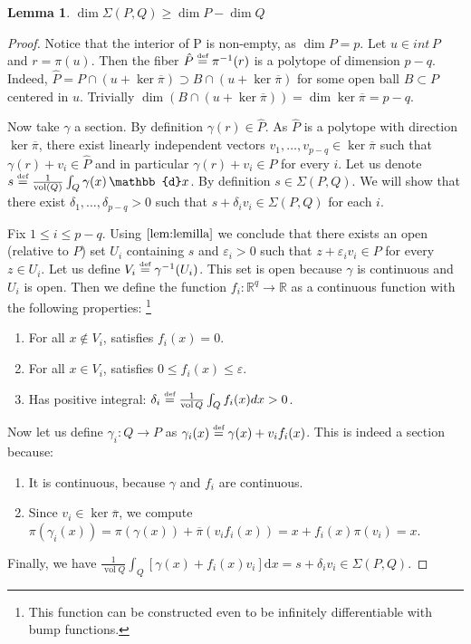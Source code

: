 \documentclass[10pt,a4paper]{article}
\DeclareMathOperator{\vol}{vol}
\def\defs{\stackrel{\tiny{\mbox{def}}}{=}}		%
\newcommand{\RR}{\mathbb{R}}
\newcommand{\eps}{\varepsilon}
\theoremstyle{plain}
\newtheorem{lemma}{Lemma}
\theoremstyle{remark}
\theoremstyle{definition}
\begin{document}
\begin{lemma} \label{lemm:dimm}
    $\dim \Sigma(P,Q) \geq \dim P - \dim Q$
\end{lemma} 
\begin{proof}
	Notice that the interior of P is non-empty, 
	as $\dim P=p$.	
	Let $u\in int \, P$ and $r=\pi(u)$. 
	Then the fiber $\hat{P}\defs \pi^{-1}(r)$ 
	is a polytope of dimension $p-q$. 
	Indeed, 
	$\hat{P}= P \cap (u + \ker \overline\pi)
	\supset B \cap (u + \ker \overline\pi)$ 
	for some open ball
	$B\subset P$ centered in $u$. 
	Trivially 
	$\dim (B \cap (u + \ker \overline\pi)) = 
	\dim \ker \overline\pi=p-q$.\par
	Now take $\gamma$ a section. 
	By definition $\gamma(r)\in \hat{P}$. 
	As $\hat{P}$ is a polytope with direction $\ker \overline\pi$,
	there exist linearly independent vectors 
	$v_1,\dots, v_{p-q}\in \ker \overline\pi$ such that 
	$\gamma(r)+ v_i\in \hat{P}$ and 
	in particular $\gamma(r)+ v_i \in P$ for every $i$.
	Let us denote $s\defs \frac{1}{\vol(Q)}\int_Q\gamma(x) \,\mathbb{d}x$. 
	By definition $s \in \Sigma(P,Q)$. 
	We will show that there exist $\delta_1,\dots, \delta_{p-q} > 0$ such that $s + \delta_i v_i \in \Sigma(P,Q)$ for each $i$. \par  
	Fix $1\leq i \leq p-q$. 
	Using $\cref{lem:lemilla}$ we conclude that 
	there exists an open (relative to $P$) set $U_i$ containing $s$ and $\eps_i>0$ 
	such that $z+ \eps_i v_i \in P$ for every $z\in U_i$.  
	Let us define $V_i \defs \gamma^{-1}(U_i)$.
	This set is open because $\gamma$ is continuous and $U_i$ is open.
	Then we define the function $f_i \colon \RR^q \to \RR$
	as a continuous function with the following properties:
	\footnote{This function can be constructed even to be infinitely differentiable
		with bump functions.}
	\begin{enumerate}
		\item For all $x\notin V_i$, satisfies $f_i(x) = 0$.
		\item For all $x\in V_i $, satisfies $0 \leq f_i(x) \leq \eps$.
		\item \label{itm:prova} Has positive integral: 
		$\delta_i \defs \frac{1}{\vol Q}\int_Q f_i(x) dx > 0$.
	\end{enumerate}
	
	Now let us define $\gamma_i\colon Q\to P$ as
	$\gamma_i(x) \defs \gamma(x) + v_if_i(x)$.
	This is indeed a section because:
	\begin{enumerate}
		\item It is continuous, because $\gamma$ and $f_i$ are continuous.
		\item Since $v_i\in \ker  \overline\pi$,  
		we compute
		$\pi(\gamma_i(x)) = \pi(\gamma(x)) + \overline\pi(v_if_i(x)) = x + f_i(x)\pi(v_i) = x$. 
	\end{enumerate}
	Finally, we have 
	$\frac{1}{\vol Q}\int_Q [\gamma(x)+ f_i(x)v_i] \mathrm{ d}x = 
	s + \delta_i v_i \in \Sigma(P,Q)$.
\end{proof}
\end{document}
